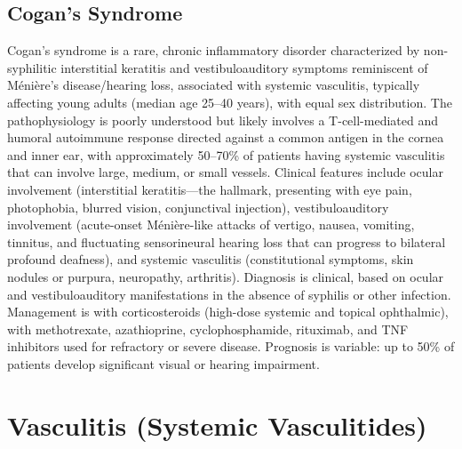 \subsection{Cogan's Syndrome}
\label{sec:Cogan's Syndrome}
Cogan's syndrome is a rare, chronic inflammatory disorder characterized by non-syphilitic interstitial keratitis and vestibuloauditory symptoms reminiscent of Ménière's disease/hearing loss, associated with systemic vasculitis, typically affecting young adults (median age 25--40 years), with equal sex distribution. The pathophysiology is poorly understood but likely involves a T-cell-mediated and humoral autoimmune response directed against a common antigen in the cornea and inner ear, with approximately 50--70\% of patients having systemic vasculitis that can involve large, medium, or small vessels. Clinical features include ocular involvement (interstitial keratitis---the hallmark, presenting with eye pain, photophobia, blurred vision, conjunctival injection), vestibuloauditory involvement (acute-onset Ménière-like attacks of vertigo, nausea, vomiting, tinnitus, and fluctuating sensorineural hearing loss that can progress to bilateral profound deafness), and systemic vasculitis (constitutional symptoms, skin nodules or purpura, neuropathy, arthritis). Diagnosis is clinical, based on ocular and vestibuloauditory manifestations in the absence of syphilis or other infection. Management is with corticosteroids (high-dose systemic and topical ophthalmic), with methotrexate, azathioprine, cyclophosphamide, rituximab, and TNF inhibitors used for refractory or severe disease. Prognosis is variable: up to 50\% of patients develop significant visual or hearing impairment.

\section{Vasculitis (Systemic Vasculitides)}






